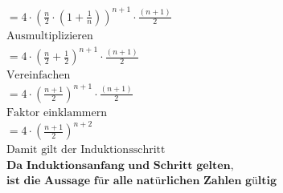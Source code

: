 \documentclass{article}
\begin{document}
\begin{enumerate}[label = (\alph*)]
\begin{gather*}
                    = 4 \cdot {\left( \frac{n}{2} \cdot {(1 + \frac{1}{n})} \right)}^{n+1} \cdot \frac{(n + 1)}{2} \\
                    \text{Ausmultiplizieren} \\
                    = 4 \cdot {\left( \frac{n}{2} + \frac{1}{2} \right)}^{n+1} \cdot \frac{(n + 1)}{2} \\
                    \text{Vereinfachen} \\
                    = 4 \cdot {\left( \frac{n+1}{2} \right)}^{n+1} \cdot \frac{(n + 1)}{2} \\
                    \text{Faktor einklammern} \\
                    = 4 \cdot {\left( \frac{n+1}{2} \right) }^{n+2} \\
                    \text{Damit gilt der Induktionsschritt} \\
                    \textbf{Da Induktionsanfang und Schritt gelten,} \\
                    \textbf{ist die Aussage für alle natürlichen Zahlen gültig}
                \end{gather*}
        \end{enumerate}
\end{document}
